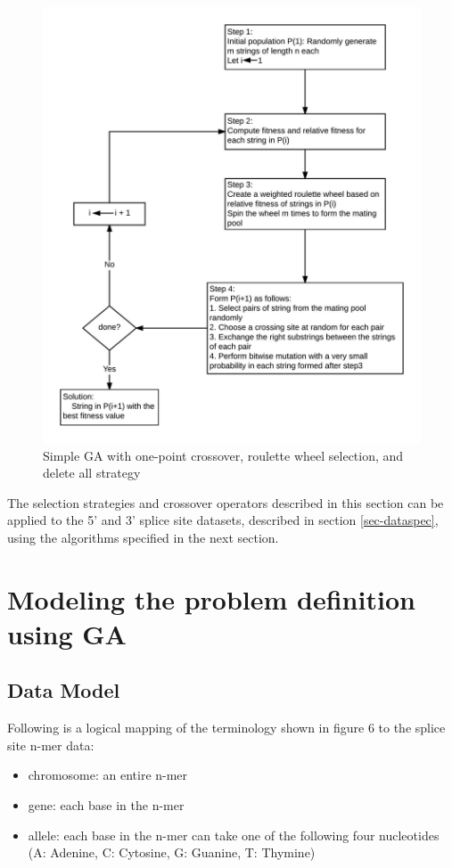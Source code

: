 \documentclass[12pt,a4paper]{article}
\begin{document}
	\begin{figure}[H]
		\includegraphics[width=\textwidth,height=\textheight]{"GA-block2-algo"}
		\caption{Simple GA with one-point crossover, roulette wheel selection, and delete all strategy}
		\centering
	\end{figure}

	The selection strategies and crossover operators described in this section can be applied to the 5' and 3' splice site datasets, described in section \ref{sec-dataspec}, using the algorithms specified in the next section.
	
	\section{Modeling the problem definition using GA} \label{sec:modelling}
	\subsection{Data Model}
	Following is a logical mapping of the terminology shown in figure 6 to the splice site n-mer data:
	\begin{itemize}
		\item chromosome: an entire n-mer
		\item gene: each base in the n-mer
		\item allele: each base in the n-mer can take one of the following four nucleotides (A: Adenine, C: Cytosine, G: Guanine, T: Thymine)
	\end{itemize}
	
\end{document}
